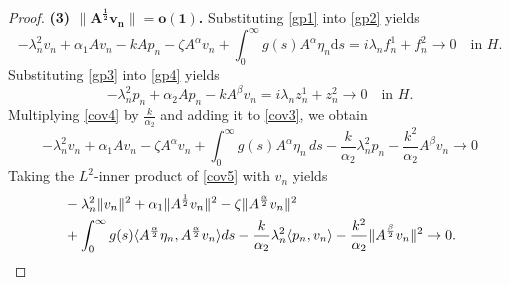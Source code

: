 \documentclass[10pt,a4paper]{amsart}
\begin{document}
\begin{proof}
		{\bf \noindent(3) $\bm{\|A^{\frac{1}{2}} v_n\|=o(1)}$.}	
		Substituting \eqref{gp1} into \eqref{gp2} yields
		\begin{equation}\label{cov3}
			-\lambda_n^2 v_n + \alpha_1 A v_n - k A p_n - \zeta A^\alpha v_n + \int_0^\infty g(s) A^\alpha \eta_n \mathrm{d}s =i\lambda_nf_n^1+f_n^2\to 0 \quad \text{in } H.
		\end{equation}
		Substituting \eqref{gp3} into \eqref{gp4}  yields
		\begin{equation}\label{cov4}
			-\lambda_n^2 p_n + \alpha_2 A p_n - k A^\beta v_n =i\lambda_nz_n^1+z_n^2\to 0 \quad \text{in } H.
		\end{equation}
		Multiplying \eqref{cov4} by $\frac{k}{\alpha_2}$ and adding it to \eqref{cov3}, we obtain
		\begin{equation}\label{cov5}
			-\lambda_n^2 v_n + \alpha_1 A v_n - \zeta A^\alpha v_n + \int_0^\infty g(s) A^\alpha \eta_n \, ds - \frac{k}{\alpha_2} \lambda_n^2 p_n - \frac{k^2}{\alpha_2} A^\beta v_n \to 0
		\end{equation}
		Taking the $L^2$-inner product of \eqref{cov5} with $v_n$ yields
		\begin{align}\label{eq:inner_product_vn}
			&-\lambda_n^2 \|v_n\|^2 + \alpha_1 \|A^{\frac{1}{2}} v_n\|^2 - \zeta \|A^{\frac{\alpha}{2}} v_n\|^2 \notag \\
			&+ \int_0^\infty g(s) \langle A^{\frac{\alpha}{2}} \eta_n, A^{\frac{\alpha}{2}} v_n \rangle ds - \frac{k}{\alpha_2} \lambda_n^2 \langle p_n, v_n \rangle
			- \frac{k^2}{\alpha_2} \|A^{\frac{\beta}{2}} v_n\|^2 \to 0.
		\end{align}
		

\end{proof}
\end{document}
